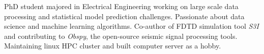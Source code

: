 

\begin{cvparagraph}

PhD student majored in Electrical Engineering working on large scale data processing and statistical model prediction challenges. Passionate about data science and machine learning algorithms. Co-author of FDTD simulation tool \textit{S3I} and contributing to \textit{Obspy}, the open-source seismic signal processing tools. Maintaining linux HPC cluster and built computer server as a hobby.
\end{cvparagraph}
